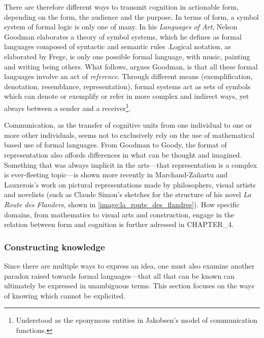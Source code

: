 There are therefore different ways to transmit cognition in actionable form, depending on the form, the audience and the purpose. In terms of form, a symbol system of formal logic is only one of many. In his \emph{Languages of Art}, Nelson Goodman elaborates a theory of symbol systems, which he defines as formal languages composed of syntactic and semantic rules \citep{goodman_languages_1976}.Logical notation, as elaborated by Frege, is only one possible formal language, with music, painting and writing being others. What follows, argues Goodman, is that all these formal languages involve an act of \emph{reference}. Through different means (exemplification, denotation, resemblance, representation), formal systems act as sets of symbols which can denote or exemplify or refer in more complex and indirect ways, yet always between a sender and a receiver\footnote{Understood as the eponymous entities  in Jakobsen's model of communication functions.}.

Communication, as the transfer of cognitive units from one individual to one or more other individuals, seems not to exclusively rely on the use of mathematical based use of formal languages. From Goodman to Goody, the format of representation also affords differences in what can be thought and imagined. Something that was always implicit in the arts—that representation is a complex is ever-fleeting topic—is shown more recently in Marchand-Zañartu and Lauxerois's work on pictural representations made by philosophers, visual artists and novelists (such as Claude Simon's sketches for the structure of his novel \emph{La Route des Flanders}, shown in \ref{image:la_route_des_flandres})\citep{marchand-zanartu_32_2022}. How specific domains, from mathematics to visual arts and construction, engage in the relation between form and cognition is further adressed in CHAPTER_4.


\subsubsection{Constructing knowledge}


Since there are multiple ways to express an idea, one must also examine another paradox raised towards formal languages—that all that can be known can ultimately be expressed in unambiguous terms. This section focuses on the ways of knowing which cannot be explicited.

